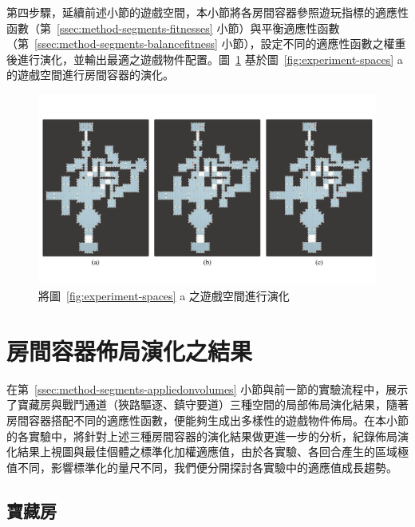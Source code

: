 第四步驟，延續前述小節的遊戲空間，本小節將各房間容器參照遊玩指標的適應性函數（第~\ref{ssec:method-segments-fitnesses} 小節）與平衡適應性函數（第~\ref{ssec:method-segments-balancefitness} 小節），設定不同的適應性函數之權重後進行演化，並輸出最適之遊戲物件配置。圖~\ref{fig:experiment-volumes-evolution} 基於圖~\ref{fig:experiment-spaces} a 的遊戲空間進行房間容器的演化。

\begin{landscape}
  \begin{figure}[H]
    \begin{center}
      \includegraphics[width=1.05\linewidth]{figures/experiments/experiment-evolution-722780748.pdf}
      \caption{將圖~\protect\ref{fig:experiment-spaces} a 之遊戲空間進行演化}
      \label{fig:experiment-volumes-evolution}
    \end{center}
  \end{figure}
\end{landscape}

\section{房間容器佈局演化之結果}
\label{sec:experiment-results}

在第~\ref{ssec:method-segments-appliedonvolumes} 小節與前一節的實驗流程中，展示了寶藏房與戰鬥通道（狹路驅逐、鎮守要道）三種空間的局部佈局演化結果，隨著房間容器搭配不同的適應性函數，便能夠生成出多樣性的遊戲物件佈局。在本小節的各實驗中，將針對上述三種房間容器的演化結果做更進一步的分析，紀錄佈局演化結果上視圖與最佳個體之標準化加權適應值，由於各實驗、各回合產生的區域極值不同，影響標準化的量尺不同，我們便分開探討各實驗中的適應值成長趨勢。


\subsection{寶藏房}
\label{ssec:experiment-results-treasure}

